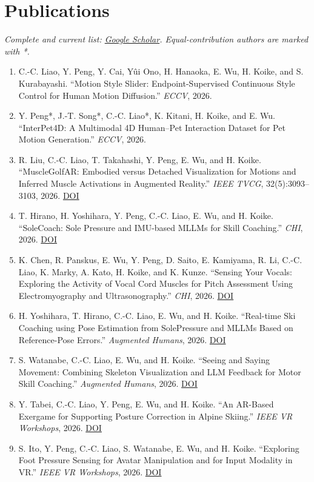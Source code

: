 \documentclass[10pt,a4paper]{article}
\newcommand{\pub}[1]{\item #1}
\begin{document}
\section*{Publications}
\textit{Complete and current list: \href{https://scholar.google.com/citations?user=jYJJazcAAAAJ}{Google Scholar}. Equal-contribution authors are marked with *.}
\begin{enumerate}
  \pub{C.-C. Liao, Y. Peng, Y. Cai, Y{\^u}i Ono, H. Hanaoka, E. Wu, H. Koike, and S. Kurabayashi. ``Motion Style Slider: Endpoint-Supervised Continuous Style Control for Human Motion Diffusion.'' \textit{ECCV}, 2026.}
  \pub{Y. Peng*, J.-T. Song*, C.-C. Liao*, K. Kitani, H. Koike, and E. Wu. ``InterPet4D: A Multimodal 4D Human--Pet Interaction Dataset for Pet Motion Generation.'' \textit{ECCV}, 2026.}
  \pub{R. Liu, C.-C. Liao, T. Takahashi, Y. Peng, E. Wu, and H. Koike. ``MuscleGolfAR: Embodied versus Detached Visualization for Motions and Inferred Muscle Activations in Augmented Reality.'' \textit{IEEE TVCG}, 32(5):3093--3103, 2026. \href{https://doi.org/10.1109/TVCG.2026.3680749}{DOI}}
  \pub{T. Hirano, H. Yoshihara, Y. Peng, C.-C. Liao, E. Wu, and H. Koike. ``SoleCoach: Sole Pressure and IMU-based MLLMs for Skill Coaching.'' \textit{CHI}, 2026. \href{https://doi.org/10.1145/3772318.3791181}{DOI}}
  \pub{K. Chen, R. Panskus, E. Wu, Y. Peng, D. Saito, E. Kamiyama, R. Li, C.-C. Liao, K. Marky, A. Kato, H. Koike, and K. Kunze. ``Sensing Your Vocals: Exploring the Activity of Vocal Cord Muscles for Pitch Assessment Using Electromyography and Ultrasonography.'' \textit{CHI}, 2026. \href{https://doi.org/10.1145/3772318.3790965}{DOI}}
  \pub{H. Yoshihara, T. Hirano, C.-C. Liao, E. Wu, and H. Koike. ``Real-time Ski Coaching using Pose Estimation from SolePressure and MLLMs Based on Reference-Pose Errors.'' \textit{Augmented Humans}, 2026. \href{https://doi.org/10.1145/3795011.3795052}{DOI}}
  \pub{S. Watanabe, C.-C. Liao, E. Wu, and H. Koike. ``Seeing and Saying Movement: Combining Skeleton Visualization and LLM Feedback for Motor Skill Coaching.'' \textit{Augmented Humans}, 2026. \href{https://doi.org/10.1145/3795011.3795054}{DOI}}
  \pub{Y. Tabei, C.-C. Liao, Y. Peng, E. Wu, and H. Koike. ``An AR-Based Exergame for Supporting Posture Correction in Alpine Skiing.'' \textit{IEEE VR Workshops}, 2026. \href{https://doi.org/10.1109/VRW70859.2026.00114}{DOI}}
  \pub{S. Ito, Y. Peng, C.-C. Liao, S. Watanabe, E. Wu, and H. Koike. ``Exploring Foot Pressure Sensing for Avatar Manipulation and for Input Modality in VR.'' \textit{IEEE VR Workshops}, 2026. \href{https://doi.org/10.1109/VRW70859.2026.00117}{DOI}}

\end{enumerate}
\end{document}
